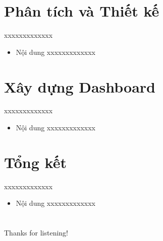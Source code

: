 \documentclass{beamer}
\begin{document}
\section{Phân tích và Thiết kế}




\begin{frame}{xxxxxxxxxxxxx}
\begin{itemize}
\item Nội dung xxxxxxxxxxxxx
\end{itemize}
\end{frame}
\section{Xây dựng Dashboard}
\begin{frame}{xxxxxxxxxxxxx}
\begin{itemize}
\item Nội dung xxxxxxxxxxxxx
\end{itemize}
\end{frame}
\section{Tổng kết}
\begin{frame}{xxxxxxxxxxxxx}
\begin{itemize}
\item Nội dung xxxxxxxxxxxxx
\end{itemize}
\end{frame}

\section*{}
\begin{frame}{}
\centering
\Huge{Thanks for listening!}
\end{frame}
\end{document}
